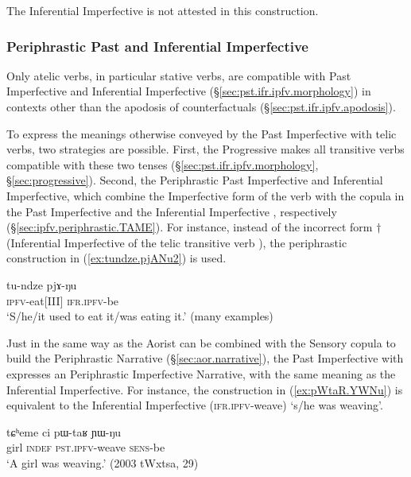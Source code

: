 The Inferential Imperfective is not attested in this construction.

\subsubsection{Periphrastic Past and Inferential Imperfective} \label{sec:pst.ifr.ipfv.periphrastic}
Only atelic verbs, in particular stative verbs, are compatible with Past Imperfective and Inferential Imperfective (§\ref{sec:pst.ifr.ipfv.morphology}) in contexts other than the apodosis of counterfactuals (§\ref{sec:pst.ifr.ipfv.apodosis}).

To express the meanings otherwise conveyed by the Past Imperfective with telic verbs, two strategies are possible. First, the Progressive  makes all transitive verbs compatible with these two tenses (§\ref{sec:pst.ifr.ipfv.morphology}, §\ref{sec:progressive}). Second, the Periphrastic Past Imperfective and Inferential Imperfective, which combine the Imperfective form of the verb with the copula in the Past Imperfective  and the Inferential Imperfective , respectively (§\ref{sec:ipfv.periphrastic.TAME}). For instance, instead of the incorrect form $\dagger$ (Inferential Imperfective of the telic transitive verb ), the periphrastic construction in (\ref{ex:tundze.pjANu2}) is used.


\begin{exe}
\ex \label{ex:tundze.pjANu2}
\gll  tu-ndze pjɤ-ŋu \\
\textsc{ipfv}-eat[III] \textsc{ifr}.\textsc{ipfv}-be \\
\glt `S/he/it used to eat it/was eating it.' (many examples)
\end{exe}


Just in the same way as the Aorist can be combined with the Sensory copula  to build the Periphrastic Narrative (§\ref{sec:aor.narrative}), the Past Imperfective with  expresses an Periphrastic Imperfective Narrative, with the same meaning as the Inferential Imperfective. For instance, the construction in (\ref{ex:pWtaR.YWNu}) is equivalent to the Inferential Imperfective  (\textsc{ifr}.\textsc{ipfv}-weave) `s/he was weaving'.

\begin{exe}
\ex \label{ex:pWtaR.YWNu}
\gll tɕʰeme ci pɯ-taʁ ɲɯ-ŋu \\
girl \textsc{indef} \textsc{pst}.\textsc{ipfv}-weave \textsc{sens}-be \\
\glt `A girl was weaving.' (2003 tWxtsa, 29)
\end{exe}

